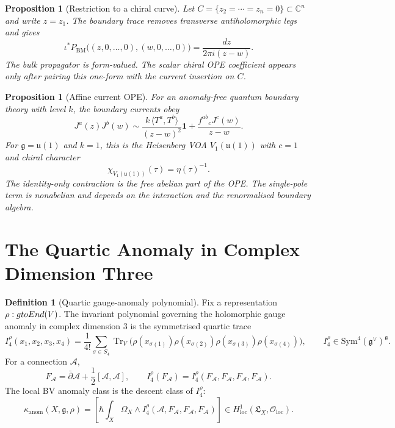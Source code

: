 \documentclass[11pt]{article}
\newtheorem{proposition}[theorem]{Proposition}
\theoremstyle{definition}
\newtheorem{definition}[theorem]{Definition}
\theoremstyle{remark}
\newcommand{\CC}{\mathbb{C}}
\newcommand{\fg}{\mathfrak{g}}
\newcommand{\fu}{\mathfrak{u}}
\newcommand{\Sym}{\mathrm{Sym}}
\newcommand{\Tr}{\operatorname{Tr}}
\newcommand{\PBM}{P_{\mathrm{BM}}}
\begin{document}
\begin{proposition}[Restriction to a chiral curve]
\label{prop:bm-restricts-cauchy}
Let \(C=\{z_2=\cdots=z_n=0\}\subset\CC^n\) and write \(z=z_1\). The
boundary trace removes transverse antiholomorphic legs and gives
\[
  \iota^*\PBM\bigl((z,0,\ldots,0),(w,0,\ldots,0)\bigr)
  =
  \frac{dz}{2\pi i(z-w)} .
\]
The bulk propagator is form-valued. The scalar chiral OPE coefficient
appears only after pairing this one-form with the current insertion on
\(C\).
\end{proposition}

\begin{proposition}[Affine current OPE]
\label{prop:current-ope}
For an anomaly-free quantum boundary theory with level \(k\), the
boundary currents obey
\[
  J^a(z)J^b(w)
  \sim
  \frac{k\,\langle T^a,T^b\rangle}{(z-w)^2}\mathbf 1
  +
  \frac{f^{ab}{}_{c}J^c(w)}{z-w}.
\]
For \(\fg=\fu(1)\) and \(k=1\), this is the Heisenberg VOA
\(V_1(\fu(1))\) with \(c=1\) and chiral character
\[
  \chi_{V_1(\fu(1))}(\tau)=\eta(\tau)^{-1}.
\]
The identity-only contraction is the free abelian part of the OPE. The
single-pole term is nonabelian and depends on the interaction and the
renormalised boundary algebra.
\end{proposition}

\section{The Quartic Anomaly in Complex Dimension Three}
\label{sec:quartic-anomaly}

\begin{definition}[Quartic gauge-anomaly polynomial]
\label{def:quartic-anomaly}
Fix a representation \(\rho:\fg\to\End(V)\). The invariant polynomial
governing the holomorphic gauge anomaly in complex dimension \(3\) is
the symmetrised quartic trace
\[
  I_4^\rho(x_1,x_2,x_3,x_4)
  =
  \frac{1}{4!}
  \sum_{\sigma\in S_4}
  \Tr_V\bigl(
  \rho(x_{\sigma(1)})\rho(x_{\sigma(2)})
  \rho(x_{\sigma(3)})\rho(x_{\sigma(4)})
  \bigr),
  \qquad
  I_4^\rho\in\Sym^4(\fg^\vee)^\fg .
\]
For a connection \(\mathcal A\),
\[
  F_{\mathcal A}
  =
  \bar\partial\mathcal A+\frac12[\mathcal A,\mathcal A],
  \qquad
  I_4^\rho(F_{\mathcal A})=I_4^\rho(F_{\mathcal A},F_{\mathcal A},
  F_{\mathcal A},F_{\mathcal A}).
\]
The local BV anomaly class is the descent class of \(I_4^\rho\):
\[
  \kappa_{\mathrm{anom}}(X,\fg,\rho)
  =
  \left[
  \hbar\int_X\Omega_X\wedge
  I_4^\rho(\mathcal A,F_{\mathcal A},F_{\mathcal A},F_{\mathcal A})
  \right]
  \in H^1_{\mathrm{loc}}(\mathfrak L_X,\mathcal O_{\mathrm{loc}}).
\]
\end{definition}
\end{document}
